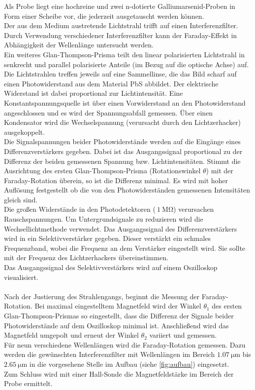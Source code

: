 Als Probe liegt eine hochreine und zwei n-dotierte Galliumarsenid-Proben in Form einer Scheibe vor, die jederzeit ausgetauscht werden können.
\\
Der aus dem Medium austretende Lichtstrahl trifft auf einen Interferenzfilter.
Durch Verwendung verschiedener Interferenzfilter kann der Faraday-Effekt in Abhängigkeit der Wellenlänge untersucht werden.
\\
Ein weiteres Glan-Thompson-Prisma teilt den linear polarisierten Lichtstrahl in senkrecht und parallel polarisierte Anteile (im Bezug auf die optische Achse) auf.
Die Lichtstrahlen treffen jeweils auf eine Sammellinse, die das Bild scharf auf einen Photowiderstand aus dem Material PbS abbildet.
Der elektrische Widerstand ist dabei proportional zur Lichtintensität.
Eine Konstantspannungsquelle ist über einen Vorwiderstand an den Photowiderstand angeschlossen und es wird der Spannungsabfall gemessen.
Über einen Kondensator wird die Wechselspannung (verursacht durch den Lichtzerhacker) ausgekoppelt.
\\
Die Signalspannungen beider Photowiderstände werden auf die Eingänge eines Differenzverstärkers gegeben.
Dabei ist das Ausgangssignal proportional zu der Differenz der beiden gemessenen Spannung bzw. Lichtintensitäten.
Stimmt die Ausrichtung des ersten Glan-Thompson-Prisma (Rotationswinkel $\theta$) mit der Faraday-Rotation überein, so ist die Differenz minimal.
Es wird mit hoher Auflösung festgestellt ob die von den Photowiderständen gemessenen Intensitäten gleich sind.
\\
Die großen Widerstände in den Photodetektoren ($~\qty{1}{\mega\ohm}$) verursachen Rauschspannungen.
Um Untergrundsignale zu reduzieren wird die Wechsellichtmethode verwendet.
Das Ausgangssignal des Differenzverstärkers wird in ein Selektivverstärker gegeben.
Dieser verstärkt ein schmales Frequenzband, wobei die Frequenz an dem Verstärker eingestellt wird.
Sie sollte mit der Frequenz des Lichtzerhackers übereinstimmen.
\\
Das Ausgangssignal des Selektivverstärkers wird auf einem Oszilloskop visualisiert.
\\
\\
Nach der Justierung des Strahlengangs, beginnt die Messung der Faraday-Rotation.
Bei maximal eingestelltem Magnetfeld wird der Winkel $\theta_1$ des ersten Glan-Thompson-Prismas so eingestellt, dass die Differenz der Signale beider Photowiderstände auf dem Oszilloskop minimal ist.
Anschließend wird das Magnetfeld umgepolt und erneut der Winkel $\theta_2$ variiert und gemessen.
\\
Für neun verschiedene Wellenlängen wird die Faraday-Rotation gemessen.
Dazu werden die gewünschten Interferenzfilter mit Wellenlängen im Bereich $\qty{1.07}{\micro\metre}$ bis $\qty{2.65}{\micro\metre}$ in die vorgesehene Stelle im Aufbau (siehe \autoref{fig:aufbau}) eingesetzt.
\\
Zum Schluss wird mit einer Hall-Sonde die Magnetfeldstärke im Bereich der Probe ermittelt.
